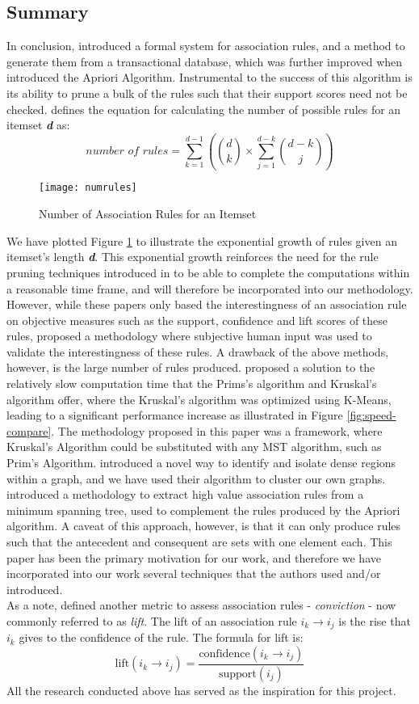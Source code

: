 \subsection{Summary}
In conclusion,  introduced a formal system for association rules, and a method to generate them from a transactional database, which was further improved when  introduced the Apriori Algorithm.
Instrumental to the success of this algorithm is its ability to prune a bulk of the rules such that their support scores need not be checked.  defines the equation for calculating the number of possible rules for an itemset \textbf{\textit{d}} as:
\[
\textit{number of rules} = \sum\limits_{k=1}^{d-1} \left(\binom{d}{k} \times \sum\limits_{j=1}^{d-k}\binom{d-k}{j}  \right)
\]
\begin{figure}[H]
\centering
\texttt{[image: numrules]}
\caption{Number of Association Rules for an Itemset}
\label{fig:numrules}
\end{figure}
We have plotted Figure \ref{fig:numrules} to illustrate the exponential growth of rules given an itemset's length \textbf{\textit{d}}.
This exponential growth reinforces the need for the rule pruning techniques introduced in  to be able to complete the computations within a reasonable time frame, and will therefore be incorporated into our methodology.
However, while these papers only based the interestingness of an association rule on objective measures such as the support, confidence and lift scores of these rules,  proposed a methodology where subjective human input was used to validate the interestingness of these rules. A drawback of the above methods, however, is the large number of rules produced.
 proposed a solution to the relatively slow computation time that the Prims's algorithm and Kruskal's algorithm offer, where the Kruskal's algorithm was optimized using K-Means, leading to a significant performance increase as illustrated in Figure \ref{fig:speed-compare}. The methodology proposed in this paper was a framework, where Kruskal's Algorithm could be substituted with any MST algorithm, such as Prim's Algorithm.
 introduced a novel way to identify and isolate dense regions within a graph, and we have used their algorithm to cluster our own graphs.
 introduced a methodology to extract high value association rules from a minimum spanning tree, used to complement the rules produced by the Apriori algorithm. A caveat of this approach, however, is that it can only produce rules such that the antecedent and consequent are sets with one element each. This paper has been the primary motivation for our work, and therefore we have incorporated into our work several techniques that the authors used and/or introduced.
\\As a note,  defined another metric to assess association rules - \textit{conviction} - now commonly referred to as \textit{lift}. The lift of an association rule $i_k \rightarrow i_j$ is the rise that $i_k$ gives to the confidence of the rule. The formula for lift is:
\[
\text{lift}(i_k \rightarrow i_j) = \frac{\text{confidence}(i_k \rightarrow i_j)}{\text{support}(i_j)}
\] 
All the research conducted above has served as the inspiration for this project.
